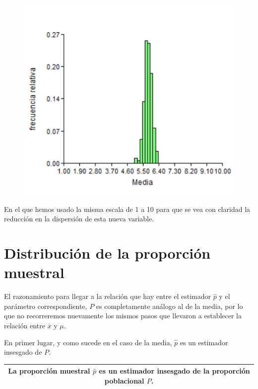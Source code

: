 \documentclass[]{book}
\begin{document}
\begin{figure}

{\centering \includegraphics[width=6.21in]{imagenes/image153} 

}

\end{figure}

En el que hemos usado la misma escala de 1 a 10 para que se vea con
claridad la reducción en la dispersión de esta nueva variable.

\hypertarget{distribuciuxf3n-de-la-proporciuxf3n-muestral}{%
\section{Distribución de la proporción muestral}\label{distribuciuxf3n-de-la-proporciuxf3n-muestral}}

El razonamiento para llegar a la relación que hay entre el estimador
\(\widehat{p}\) y el parámetro correspondiente, \(P\) es completamente
análogo al de la media, por lo que no recorreremos nuevamente los mismos pasos que llevaron a establecer la relación entre \(\overline{x}\) y \(\mu\).

En primer lugar, y como sucede en el caso de la media, \(\widehat{p}\) es
un estimador insesgado de \(P\).

\begin{longtable}[]{@{}c@{}}
\toprule
\endhead
\begin{minipage}[t]{0.97\columnwidth}\centering
La proporción muestral \(\widehat{p}\) es un estimador \textbf{insesgado} de la proporción poblacional \(P\).\strut
\end{minipage}\tabularnewline
\bottomrule
\end{longtable}
\end{document}

